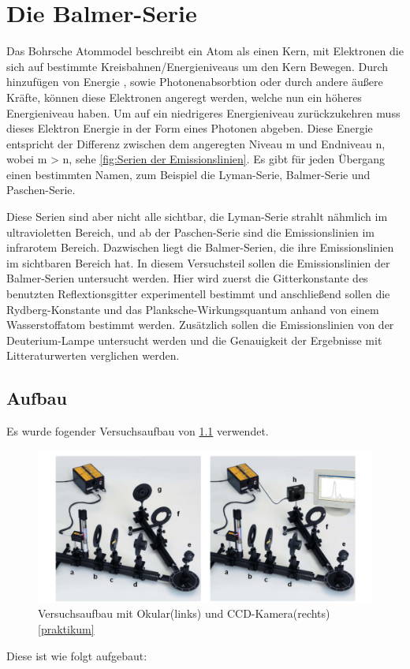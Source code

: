 \chapter{Die Balmer-Serie}

Das Bohrsche Atommodel beschreibt ein Atom als einen Kern, mit Elektronen die sich auf bestimmte Kreisbahnen/Energieniveaus um den Kern Bewegen.
Durch hinzufügen von Energie , sowie Photonenabsorbtion oder durch andere äußere Kräfte, können diese Elektronen angeregt werden, welche nun ein höheres Energieniveau haben. 
Um auf ein niedrigeres Energieniveau zurückzukehren muss dieses Elektron Energie in der Form eines Photonen abgeben. 
Diese Energie entspricht der Differenz zwischen dem angeregten Niveau m und Endniveau n, wobei m > n, sehe \cref{fig:Serien der Emissionslinien}. 
Es gibt für jeden Übergang einen bestimmten Namen, zum Beispiel die Lyman-Serie, Balmer-Serie und Paschen-Serie.


Diese Serien sind aber nicht alle sichtbar, die Lyman-Serie strahlt nähmlich im ultravioletten Bereich, und ab der Paschen-Serie sind die Emissionslinien im infrarotem Bereich.
Dazwischen liegt die Balmer-Serien, die ihre Emissionslinien im sichtbaren Bereich hat.
In diesem Versuchsteil sollen die Emissionslinien der Balmer-Serien untersucht werden. 
Hier wird zuerst die Gitterkonstante des benutzten Reflextionsgitter experimentell bestimmt und anschließend sollen die Rydberg-Konstante und das Planksche-Wirkungsquantum anhand von einem Wasserstoffatom bestimmt werden.
Zusätzlich sollen die Emissionslinien von der Deuterium-Lampe untersucht werden und die Genauigkeit der Ergebnisse mit Litteraturwerten verglichen werden.


\section{Aufbau}

Es wurde fogender Versuchsaufbau von \cref{fig:balmeraufbau} verwendet. 

\begin{figure}[htbp]
    \centering
    \includegraphics[width=0.7\linewidth]{figs/aufbau_balmer_serie.png}
    \caption{Versuchsaufbau mit Okular(links) und CCD-Kamera(rechts) \ref{praktikum}}
    \label{fig:balmeraufbau}
\end{figure}
Diese ist wie folgt aufgebaut: 

